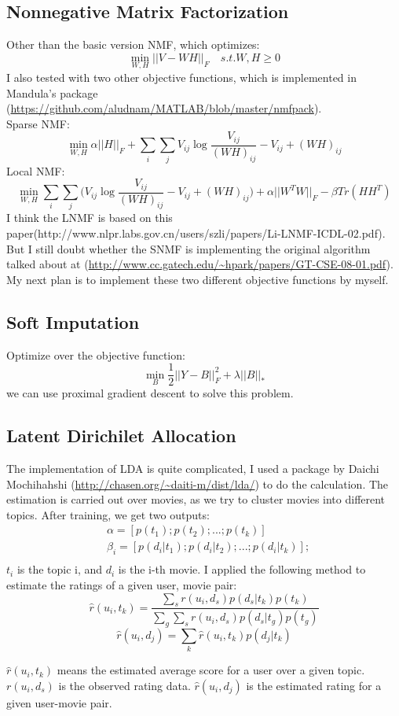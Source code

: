 \documentclass[paper=a4, fontsize=11pt]{scrartcl}
\numberwithin{equation}{section}        %
\numberwithin{figure}{section}          %
\numberwithin{table}{section}               %
\begin{document}
\subsection{Nonnegative Matrix Factorization}
Other than the basic version NMF, which optimizes:
\[
	\min_{W, H} ||V-WH||_{F} \quad s.t.W, H \geq 0 
\]
I also tested with two other objective functions, which is implemented in Mandula's package (\url{https://github.com/aludnam/MATLAB/blob/master/nmfpack}).\\
Sparse NMF:
\[
	\min_{W, H} \alpha||H||_F+\sum_{i}\sum_{j} V_{ij}\log{\frac{V_{ij}}{(WH)_{ij}}-V_{ij}+(WH)_{ij}}
\]
Local NMF:
\[
	\min_{W, H}\sum_{i}\sum_{j} (V_{ij}\log{\frac{V_{ij}}{(WH)_{ij}}-V_{ij}+(WH)_{ij}) + \alpha||W^TW||_F-\beta Tr(HH^T)}
\]
I think the LNMF is based on this paper(http://www.nlpr.labs.gov.cn/users/szli/papers/Li-LNMF-ICDL-02.pdf). But I still doubt whether the SNMF is implementing the original algorithm talked about at (\url{http://www.cc.gatech.edu/~hpark/papers/GT-CSE-08-01.pdf}). My next plan is to implement these two different objective functions by myself.
\subsection{Soft Imputation}
Optimize over the objective function:
\[
	\min_{B} \frac{1}{2}||Y-B||_{F}^2 + \lambda||B||_{*}
\]
we can use proximal gradient descent to solve this problem.
\subsection{Latent Dirichilet Allocation}
The implementation of LDA is quite complicated, I used a package by Daichi Mochihahshi (\url{http://chasen.org/~daiti-m/dist/lda/}) to do the calculation. The estimation is carried out over movies, as we try to cluster movies into different topics. After training, we get two outputs:
\begin{align*}
	&\alpha = [p(t_1);p(t_2);...;p(t_k)]\\
	&\beta_i = [p(d_i|t_1);p(d_i|t_2);...;p(d_i|t_k)];\\
\end{align*}
$t_i$ is the topic i, and $d_i$ is the i-th movie. I applied the following method to estimate the ratings of a given user, movie pair:
\[ \hat{r}(u_i, t_k) = \frac{\sum_s r(u_i, d_s)p(d_s | t_k)p(t_k)}{\sum_g \sum_s  r(u_i, d_s)p(d_s | t_g)p(t_g)}\]
\[ \hat{r}(u_i, d_j) = \sum_k \hat{r}(u_i , t_k)p(d_j|t_k)\]

$\hat{r}(u_i, t_k)$ means the estimated average score for a user over a given topic.$r(u_i, d_s)$ is the observed rating data. $\hat{r}(u_i, d_j)$ is the estimated rating for a given user-movie pair.
\end{document}
